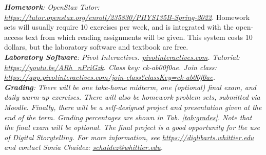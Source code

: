 \documentclass[10pt]{article}
\begin{document}
\textit{\textbf{Homework}: OpenStax Tutor: \url{https://tutor.openstax.org/enroll/235830/PHYS135B-Spring-2022}.} Homework sets will usually require 10 exercises per week, and is integrated with the open-access text from which reading assignments will be given. This system costs 10 dollars, but the laboratory software and textbook are free. \\
\textit{\textbf{Laboratory Software}: Pivot Interactives. \url{pivotinteractives.com}.  Tutorial: \url{https://youtu.be/ARh_nPriGzk}.  Class key: ck-ab00f0ae.  Join class: \url{https://app.pivotinteractives.com/join-class?classKey=ck-ab00f0ae}.} \\
\textit{\textbf{Grading}: There will be one take-home midterm, one (optional) final exam, and daily warm-up exercises.  There will also be homework problem sets, submitted via Moodle.  Finally, there will be a self-designed project and presentation given at the end of the term.  Grading percentages are shown in Tab. \ref{tab:grades}.  \textit{Note that the final exam will be optional.} The final project is a good opportunity for the use of Digital Storytelling.  For more information, see \url{https://diglibarts.whittier.edu} and contact Sonia Chaidez: \url{schaidez@whittier.edu}. } \\
\end{document}
